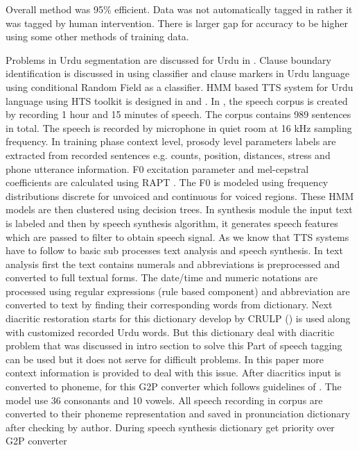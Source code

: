 Overall method was 95\% efficient. Data was not automatically tagged in \cite{anwar2007statistical} rather it was tagged by human
intervention. There is larger gap for accuracy to be higher using some other methods of training data.

Problems in Urdu segmentation are discussed for Urdu in \cite{durrani2010urdu}. Clause boundary identification is discussed in 
\cite{parveen2011clause} using classifier
and clause markers in Urdu language using conditional Random Field as a classifier. HMM based TTS system for
Urdu language using HTS toolkit is designed in \cite{ahmed2014hmm} and \cite{nawaz2014hidden}. In \cite{ahmed2014hmm}, the speech corpus is created by recording 1 hour and 15 minutes of speech. The corpus contains 989 sentences in total. The speech is recorded by microphone in quiet room at 16 kHz sampling frequency. In training phase context level, prosody level parameters labels are extracted from recorded sentences e.g. counts, position, distances, stress and phone utterance information. F0 excitation parameter and mel-cepstral coefficients are calculated using RAPT \cite{kleijn1995speech}. The F0 is modeled using frequency
distributions discrete for unvoiced and continuous for voiced regions. These HMM models are then clustered using decision
trees. In synthesis module the input text is labeled and then by speech synthesis algorithm, it generates speech features which
are passed to filter to obtain speech signal. As we know that TTS systems have to follow to basic sub processes text analysis
and speech synthesis. In text analysis first the text contains numerals and abbreviations is preprocessed and converted to full
textual forms. The date/time and numeric notations are processed using regular expressions (rule based component) and
abbreviation are converted to text by finding their corresponding words from dictionary. Next diacritic restoration starts for
this dictionary develop by CRULP (\cite{crulp}) is used along with customized recorded Urdu words. But this dictionary
deal with diacritic problem that was discussed in intro section to solve this Part of speech tagging can be used but it does not
serve for difficult problems. In this paper more context information is provided to deal with this issue. After diacritics input is
converted to phoneme, for this G2P converter which follows guidelines of \cite{hussain2004sound}. The model use 36
consonants and 10 vowels. All speech recording in corpus are converted to their phoneme representation and saved in
pronunciation dictionary after checking by author. During speech synthesis dictionary get priority over G2P converter
